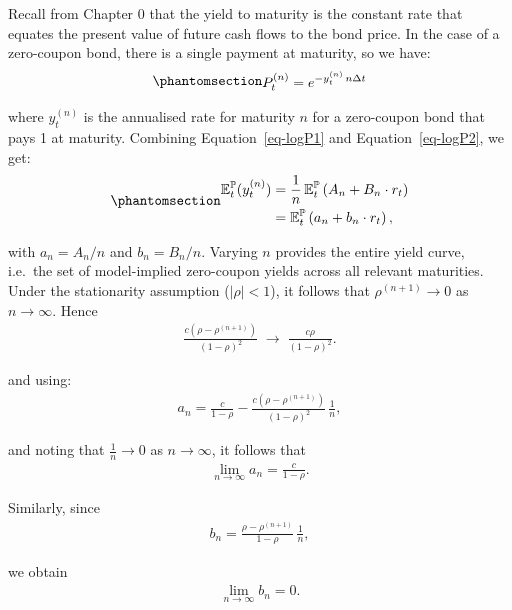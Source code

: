 \documentclass[
  letterpaper,
  DIV=11,
  numbers=noendperiod]{scrreprt}
\begin{document}
Recall from Chapter 0 that the yield to maturity is the constant rate
that equates the present value of future cash flows to the bond price.
In the case of a zero-coupon bond, there is a single payment at
maturity, so we have:
\begin{equation}\protect\phantomsection\label{eq-logP2}{
\begin{align}
    P_t^{(n)} = e^{-y^{(n)}_t\, n \Delta t}
\end{align}
}\end{equation}

where \(y_t^{(n)}\) is the annualised rate for maturity \(n\) for a
zero-coupon bond that pays 1 at maturity. Combining
Equation~\ref{eq-logP1} and Equation~\ref{eq-logP2}, we get:
\begin{equation}\protect\phantomsection\label{eq-sr-yieldCurve}{
\begin{align}
    \mathbb{E}_t^{\mathbb{P}}(y_t^{(n)}) &= \frac{1}{n} \, \mathbb{E}_t^{\mathbb{P}}\left(A_n + B_n \cdot r_t\right) \nonumber \\
    &= \mathbb{E}_t^{\mathbb{P}}\left(a_n + b_n \cdot r_t\right),
\end{align}
}\end{equation}

with \(a_n = A_n/n\) and \(b_n = B_n/n\). Varying \(n\) provides the
entire yield curve, i.e.~the set of model-implied zero-coupon yields
across all relevant maturities. Under the stationarity assumption
(\(|\rho|<1\)), it follows that \(\rho^{(n+1)} \to 0\) as
\(n \to \infty\). Hence
\begin{align}
    \frac{c(\rho-\rho^{(n+1)})}{(1-\rho)^2} \; \to \; \frac{c\rho}{(1-\rho)^2}.
\end{align}

and using:
\begin{align}
    a_n = \frac{c}{1-\rho}
      - \frac{c(\rho-\rho^{(n+1)})}{(1-\rho)^2}\,\frac{1}{n},
\end{align}

and noting that \(\frac{1}{n} \to 0\) as \(n \to \infty\), it follows
that
\begin{align}
\lim_{n\to\infty} a_n = \frac{c}{1-\rho}.
\end{align}

Similarly, since
\begin{align}
b_n = \frac{\rho-\rho^{(n+1)}}{1-\rho}\,\frac{1}{n},
\end{align}

we obtain
\begin{align}
\lim_{n\to\infty} b_n = 0.
\end{align}
\end{document}
